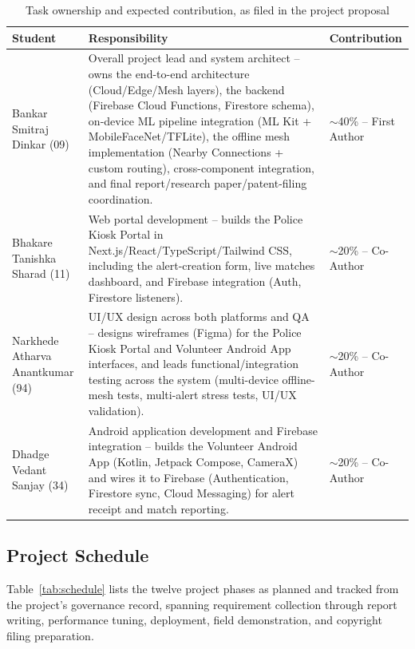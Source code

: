 \documentclass[12pt,a4paper,oneside]{report}
\begin{document}
\begin{table}[H]
\centering
\caption{Task ownership and expected contribution, as filed in the project proposal}
\label{tab:ownership}
\begin{tabular}{|p{2.7cm}|p{8.0cm}|p{2.3cm}|}
\hline
\textbf{Student} & \textbf{Responsibility} & \textbf{Contribution} \\
\hline
Bankar Smitraj Dinkar (09) &
Overall project lead and system architect -- owns the end-to-end
architecture (Cloud/Edge/Mesh layers), the backend (Firebase Cloud
Functions, Firestore schema), on-device ML pipeline integration (ML Kit +
MobileFaceNet/TFLite), the offline mesh implementation (Nearby Connections
+ custom routing), cross-component integration, and final report/research
paper/patent-filing coordination. &
$\sim$40\% -- First Author \\
\hline
Bhakare Tanishka Sharad (11) &
Web portal development -- builds the Police Kiosk Portal in
Next.js/React/TypeScript/Tailwind CSS, including the alert-creation form,
live matches dashboard, and Firebase integration (Auth, Firestore
listeners). &
$\sim$20\% -- Co-Author \\
\hline
Narkhede Atharva Anantkumar (94) &
UI/UX design across both platforms and QA -- designs wireframes (Figma)
for the Police Kiosk Portal and Volunteer Android App interfaces, and
leads functional/integration testing across the system (multi-device
offline-mesh tests, multi-alert stress tests, UI/UX validation). &
$\sim$20\% -- Co-Author \\
\hline
Dhadge Vedant Sanjay (34) &
Android application development and Firebase integration -- builds the
Volunteer Android App (Kotlin, Jetpack Compose, CameraX) and wires it to
Firebase (Authentication, Firestore sync, Cloud Messaging) for alert
receipt and match reporting. &
$\sim$20\% -- Co-Author \\
\hline
\end{tabular}
\end{table}

\subsection{Project Schedule}

Table~\ref{tab:schedule} lists the twelve project phases as planned and
tracked from the project's governance record, spanning requirement
collection through report writing, performance tuning, deployment, field
demonstration, and copyright filing preparation.
\end{document}
